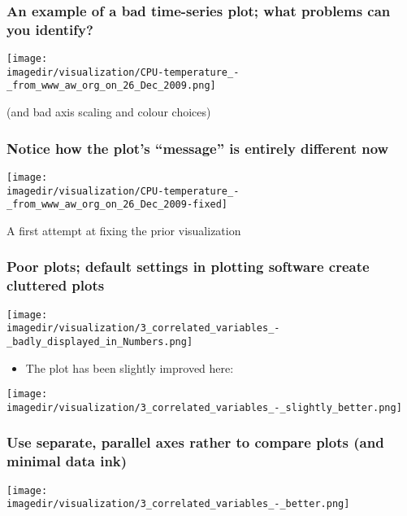 \begin{frame}\frametitle{An example of a bad time-series plot; what problems can you identify?}

	
	\centerline{\texttt{[image: \\imagedir/visualization/CPU-temperature\_-\_from\_www\_aw\_org\_on\_26\_Dec\_2009.png]}}
	(and bad axis scaling and colour choices)
	
\end{frame}

\begin{frame}\frametitle{Notice how the plot's ``message'' is entirely different now}
	\texttt{[image: \\imagedir/visualization/CPU-temperature\_-\_from\_www\_aw\_org\_on\_26\_Dec\_2009-fixed]}
	
	A first attempt at fixing the prior visualization
\end{frame}

\begin{frame}\frametitle{Poor plots; default settings in plotting software create cluttered plots}
	\vspace{2pt}
	\centerline{\texttt{[image: \\imagedir/visualization/3\_correlated\_variables\_-\_badly\_displayed\_in\_Numbers.png]}}
	\begin{itemize}
		\item	The plot has been slightly improved here:
	\end{itemize}
	\centerline{\texttt{[image: \\imagedir/visualization/3\_correlated\_variables\_-\_slightly\_better.png]}}
\end{frame}

\begin{frame}\frametitle{Use separate, parallel axes rather to compare plots (and minimal data ink)}
	
	\centerline{\texttt{[image: \\imagedir/visualization/3\_correlated\_variables\_-\_better.png]}}
	
	\vspace{12pt}
	\color{myOrange}{These non-default settings can take a long time to set (10 minutes for this example)}
\end{frame}

